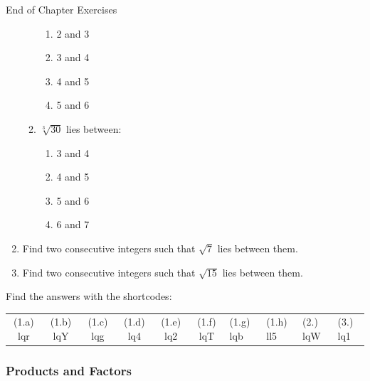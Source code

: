 \begin{eocexercises}{End of Chapter Exercises}
\begin{enumerate}[itemsep=5pt, label=\textbf{\arabic*}. ]
\begin{enumerate}[itemsep=5pt, label=\textbf{\alph*}. ]
\begin{enumerate}[itemsep=5pt, label=\textbf{\roman*}. ]
            \item 2 and 3\item 3 and 4\item 4 and 5\item 5 and 6\end{enumerate}
                      \item $\sqrt[3]{30}$ lies between:
\label{m38347*id73224}\begin{enumerate}[itemsep=5pt, label=\textbf{\roman*}. ] 
            \item 3 and 4\item 4 and 5\item 5 and 6\item 6 and 7\end{enumerate}
                      \end{enumerate}
        \item  Find two consecutive integers such that $\sqrt{7}$ lies between them.          \item  Find two consecutive integers such that $\sqrt{15}$ lies between them.          \end{enumerate}
  \label{m38347**end}
\par {} Find the answers with the shortcodes:
 \par \begin{tabular}[h]{cccccc}
 (1.a) lqr  &  (1.b) lqY  &  (1.c) lqg  &  (1.d) lq4  &  (1.e) lq2  &  (1.f) lqT  &  (1.g) lqb  &  (1.h) ll5  &  (2.) lqW  &  (3.) lq1  & \end{tabular}
\subsubsection*{Products and Factors}
          

\end{eocexercises}
